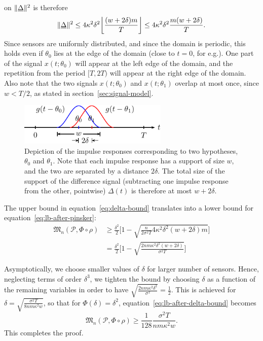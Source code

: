 \documentclass[conference]{IEEEtran}
\providecommand{\v}{}
\renewcommand{\v}[1]{\underline{#1}}
\DeclarePairedDelimiter\norm{\lVert}{\rVert}
\DeclarePairedDelimiter\floor{\lfloor}{\rfloor}
\newcommand{\Phiorho}{\Phi\!\circ\!\rho}
\begin{document}
\begin{IEEEproof}
on $\norm{\v\Delta}^2$ is therefore
\begin{equation} \label{eq:delta-bound}
	\norm{\v\Delta}^2 \leq 4 \kappa^2 \delta^2 \floor*{\frac{(w + 2\delta)m}{T}} \leq 4 \kappa^2 \delta^2 \frac{m (w + 2\delta)}{T}.
\end{equation}
Since sensors are uniformly distributed, and since the domain is periodic, this
holds even if $\theta_0$ lies at the edge of the domain (close to $t=0$, for
e.g.). One part of the signal $x(t;\theta_0)$ will appear at the left edge of
the domain, and the repetition from the period $[T, 2T)$ will appear at the
right edge of the domain. Also note that the two signals $x(t;\theta_0)$ and
$x(t;\theta_1)$ overlap at most once, since $w < T/2$, as stated in
section~\ref{sec:signal-model}.

\begin{figure}[tp] %
	\centering
	\includegraphics[width=2.8in]{overlap-middle-pics}
	\caption{Depiction of the impulse responses corresponding to two
	hypotheses, $\theta_0$ and $\theta_1$. Note that each impulse response has
a support of size $w$, and the two are separated by a distance $2\delta$. The
total size of the support of the difference signal (subtracting one impulse
response from the other, pointwise) $\Delta(t)$ is therefore at most $w +
2\delta$.}
	\label{fig:overlap-middle}
\end{figure}

The upper bound in equation~\eqref{eq:delta-bound} translates into a lower
bound for equation~\eqref{eq:lb-after-pinsker}:
\begin{align}
	\mathfrak{M}_n(\mathcal{P}, \Phiorho) &\geq \frac{\delta^2}{2} \Bigg[ 1 - \sqrt{\frac{n}{2\sigma^2 T} 4 \kappa^2 \delta^2 (w + 2\delta) m} \Bigg] \\
	&= \frac{\delta^2}{2} \Bigg[ 1 - \sqrt{\frac{2nm \kappa^2 \delta^2 (w + 2\delta)}{\sigma^2 T}} \Bigg] \label{eq:lb-after-delta-bound}
\end{align}

Asymptotically, we choose smaller values of $\delta$ for larger number of
sensors. Hence, neglecting terms of order $\delta^3$, we tighten the bound by
choosing $\delta$ as a function of the remaining variables in order to have
$\sqrt{\frac{2nm\kappa^2\delta^2 }{\sigma^2}} = \frac{1}{2}$. This is achieved
for $\delta = \sqrt{\frac{\sigma^2T}{8nm\kappa^2 w}}$, so that for
$\Phi(\delta) = \delta^2$, equation~\eqref{eq:lb-after-delta-bound} becomes
\begin{equation}
	\mathfrak{M}_n(\mathcal{P}, \Phiorho) \geq \frac{1}{128} \frac{\sigma^2 T}{nm\kappa^2 w}.
\end{equation}
This completes the proof.
\end{IEEEproof}
\end{document}

